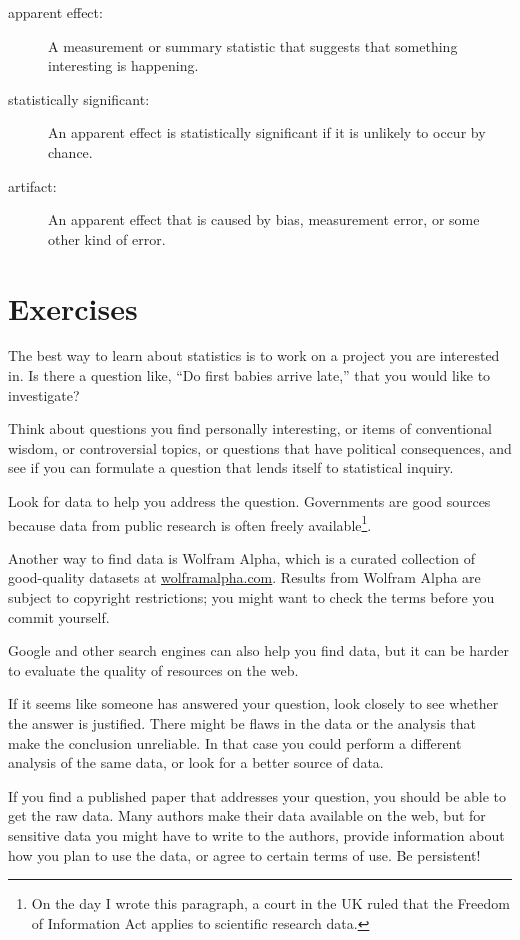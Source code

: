 \documentclass[12pt]{book}
\begin{document}
\begin{description}
\item[apparent effect:] A measurement or summary statistic that
suggests that something interesting is happening.

\item[statistically significant:] An apparent effect is statistically
  significant if it is unlikely to occur by chance.

\item[artifact:] An apparent effect that is caused by bias,
  measurement error, or some other kind of error.

\end{description}

\section{Exercises}

\begin{ex}

The best way to learn about statistics is to work on a project you are
interested in.  Is there a question like, ``Do first babies arrive
late,'' that you would like to investigate?

Think about questions you find personally interesting, or items of
conventional wisdom, or controversial topics, or questions that have
political consequences, and see if you can formulate a question that
lends itself to statistical inquiry.

Look for data to help you address the
question.  Governments are good sources because data from
public research is often freely available\footnote{On the day
I wrote this paragraph, a court in the UK ruled that the
Freedom of Information Act applies to scientific research data.}.

Another way to find data is Wolfram Alpha, which is a curated
collection of good-quality datasets at \url{wolframalpha.com}.
Results from Wolfram Alpha are subject to copyright
restrictions; you might want to check the terms before you commit
yourself.

Google and other search engines can also help you find data, but it
can be harder to evaluate the quality of resources on the web.

If it seems like someone has answered your question, look closely to
see whether the answer is justified.  There might be flaws in the data
or the analysis that make the conclusion unreliable.  In that case you
could perform a different analysis of the same data, or look for a
better source of data.

If you find a published paper that addresses your question, you
should be able to get the raw data.  Many authors make their data
available on the web, but for sensitive data you might have to
write to the authors, provide information about how you plan to use
the data, or agree to certain terms of use.  Be persistent!

\end{ex}
\end{document}
